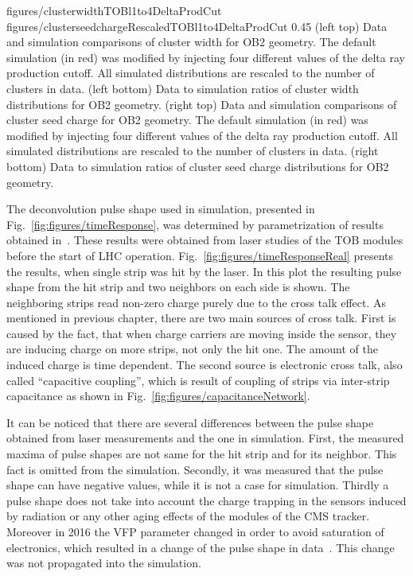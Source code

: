                  {figures/clusterwidthTOBl1to4DeltaProdCut}
                 {figures/clusterseedchargeRescaledTOBl1to4DeltaProdCut} %
                 {0.45}       %
                 {(left top) Data and simulation  comparisons of cluster width for OB2 geometry. The default simulation (in red) was modified by injecting four different values of the delta ray production cutoff. All simulated distributions are rescaled to the number of clusters in data. (left bottom) Data to simulation ratios of cluster width distributions for OB2 geometry. (right top) Data and simulation  comparisons of cluster seed charge for OB2 geometry. The default simulation (in red) was modified by injecting four different values of the delta ray production cutoff. All simulated distributions are rescaled to the number of clusters in data. (right bottom) Data to simulation ratios of cluster seed charge distributions for OB2 geometry. }


The deconvolution pulse shape used in simulation, presented in Fig.~\ref{fig:figures/timeResponse}, was determined by parametrization of results obtained in~\cite{Delaere:1061284}. These results were obtained from laser studies of the TOB modules before the start of LHC operation. Fig.~\ref{fig:figures/timeResponseReal} presents the results, when single strip was hit by the laser. In this plot the resulting pulse shape from the hit strip and two neighbors on each side is shown. The neighboring strips read non-zero charge purely due to the cross talk effect. As mentioned in previous chapter, there are two main sources of cross talk. First is caused by the fact, that when charge carriers are moving inside the sensor, they are inducing charge on more strips, not only the hit one. The amount of the induced charge is time dependent. The second source is electronic cross talk, also called ``capacitive coupling'', which is result of coupling of strips via inter-strip capacitance as shown in Fig.~\ref{fig:figures/capacitanceNetwork}. 


It can be noticed that there are several differences between the pulse shape obtained from laser measurements and the one in simulation. First, the measured maxima of pulse shapes are not same for the hit strip and for its neighbor. This fact is omitted from the simulation. Secondly, it was measured that the pulse shape can have negative values, while it is not a case for simulation. Thirdly a pulse shape does not take into account the charge trapping in the sensors induced by radiation or any other aging effects of the modules of the CMS tracker. Moreover in 2016 the VFP parameter changed in order to avoid saturation of electronics, which resulted in a change of the pulse shape in data~\cite{website:vfp}. This change was not propagated into the simulation.

